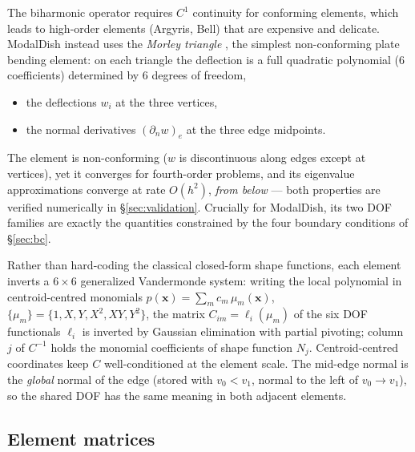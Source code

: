 \documentclass[11pt,a4paper]{article}
\begin{document}
The biharmonic operator requires $C^1$ continuity for conforming elements,
which leads to high-order elements (Argyris, Bell) that are expensive and
delicate. ModalDish instead uses the \emph{Morley triangle}
\cite{morley}, the simplest non-conforming plate bending element: on each
triangle the deflection is a full quadratic polynomial (6 coefficients)
determined by 6 degrees of freedom,
%
\begin{itemize}
\item the deflections $w_i$ at the three vertices,
\item the normal derivatives $(\partial_n w)_e$ at the three edge
  midpoints.
\end{itemize}
%
The element is non-conforming ($w$ is discontinuous along edges except at
vertices), yet it converges for fourth-order problems, and its eigenvalue
approximations converge at rate $O(h^2)$, \emph{from below}
\cite{rannacher,babuska-osborn} --- both properties are verified numerically
in \S\ref{sec:validation}. Crucially for ModalDish, its two DOF families are
exactly the quantities constrained by the four boundary conditions of
\S\ref{sec:bc}.

Rather than hard-coding the classical closed-form shape functions, each
element inverts a $6\times 6$ generalized Vandermonde system: writing the
local polynomial in centroid-centred monomials
$p(\bm{x}) = \sum_m c_m\, \mu_m(\bm{x})$,
$\{\mu_m\} = \{1, X, Y, X^2, XY, Y^2\}$, the matrix
$C_{im} = \ell_i(\mu_m)$ of the six DOF functionals $\ell_i$ is inverted by
Gaussian elimination with partial pivoting; column $j$ of $C^{-1}$ holds the
monomial coefficients of shape function $N_j$. Centroid-centred coordinates
keep $C$ well-conditioned at the element scale. The mid-edge normal is the
\emph{global} normal of the edge (stored with $v_0<v_1$, normal to the left
of $v_0\!\to\!v_1$), so the shared DOF has the same meaning in both adjacent
elements.

\subsection{Element matrices}
\end{document}
